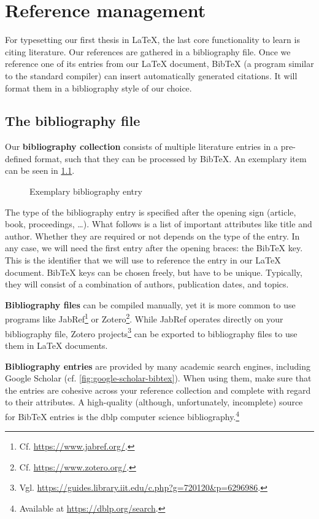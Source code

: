 \chapter{Reference management}
\label{sec:literature}

For typesetting our first thesis in \LaTeX{}, the last core functionality to learn is citing literature.
Our references are gathered in a bibliography file.
Once we reference one of its entries from our \LaTeX{} document, Bib\TeX{} (a 
program similar to the standard  compiler)
can insert automatically generated citations.
It will format them in a bibliography style of our choice.

\section{The bibliography file}
Our \textbf{bibliography collection} consists of multiple literature entries in a pre-defined format, such that they can be processed by Bib\TeX{}.
An exemplary item can be seen in \cref{lst:bibfile-sample-entry}.

\begin{figure}[H]

  \caption{Exemplary bibliography entry}
  \label{lst:bibfile-sample-entry}
\end{figure}

The type of the bibliography entry is specified after the opening  sign (article, book, proceedings, …).
What follows is a list of important attributes like title and author.
Whether they are required or not depends on the type of the entry.
In any case, we will need the first entry after the opening braces: the Bib\TeX{} key.
This is the identifier that we will use to reference the entry in our \LaTeX{} document.
Bib\TeX{} keys can be chosen freely, but have to be unique.
Typically, they will consist of a combination of authors, publication dates, and topics.\newpage

\textbf{Bibliography files} can be compiled manually, yet it is more common to use programs like JabRef\footnote{Cf. \url{https://www.jabref.org/}.} or Zotero\footnote{Cf. \url{https://www.zotero.org/}.}.
While JabRef operates directly on your bibliography file, Zotero projects\footnote{Vgl. \url{https://guides.library.iit.edu/c.php?g=720120&p=6296986}.} can be exported to bibliography files to use them in \LaTeX{} documents.

\textbf{Bibliography entries} are provided by many academic search engines, including Google Scholar (cf. \cref{fig:google-scholar-bibtex}).
When using them, make sure that the entries are cohesive across your reference collection and complete with regard to their attributes.
A high-quality (although, unfortunately, incomplete) source for Bib\TeX{} entries is the dblp computer science bibliography.\footnote{Available at \url{https://dblp.org/search}.}

